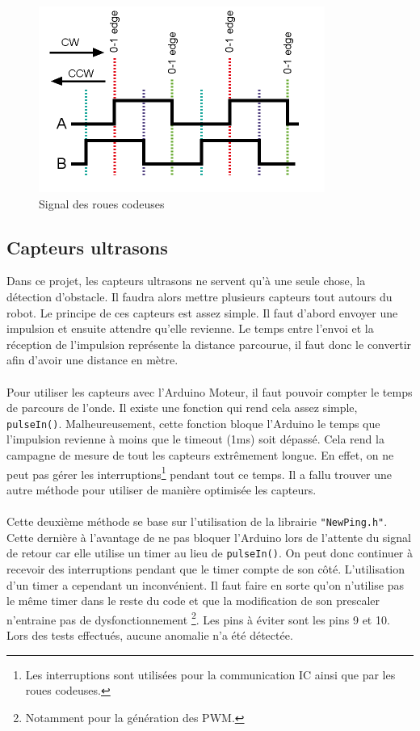 \begin{figure}[!ht]
	\centering
	\includegraphics{roues_codeuses.png}
	\caption{Signal des roues codeuses}
	\label{img:rotary_encoder}
\end{figure}

\subsection{Capteurs ultrasons}
Dans ce projet, les capteurs ultrasons ne servent qu'à une seule chose, la détection d'obstacle. Il faudra alors mettre plusieurs capteurs tout autours du robot. Le principe de ces capteurs est assez simple. Il faut d'abord envoyer une impulsion et ensuite attendre qu'elle revienne. Le temps entre l'envoi et la réception de l'impulsion représente la distance parcourue, il faut donc le convertir afin d'avoir une distance en mètre. 

\paragraph{}
Pour utiliser les capteurs avec l'Arduino Moteur, il faut pouvoir compter le temps de parcours de l'onde. Il existe une fonction qui rend cela assez simple, \lstinline$pulseIn()$. Malheureusement, cette fonction bloque l'Arduino le temps que l'impulsion revienne à moins que le timeout (1ms) soit dépassé. Cela rend la campagne de mesure de tout les capteurs extrêmement longue. En effet, on ne peut pas gérer les interruptions\footnote{Les interruptions sont utilisées pour la communication IC ainsi que par les roues codeuses.} pendant tout ce temps. Il a fallu trouver une autre méthode pour utiliser de manière optimisée les capteurs.

\paragraph{}
Cette deuxième méthode se base sur l'utilisation de la librairie \lstinline$"NewPing.h"$. Cette dernière à l'avantage de ne pas bloquer l'Arduino lors de l'attente du signal de retour car elle utilise un timer au lieu de \lstinline$pulseIn()$. On peut donc continuer à recevoir des interruptions pendant que le timer compte de son côté. L'utilisation d'un timer a cependant un inconvénient. Il faut faire en sorte qu'on n'utilise pas le même timer dans le reste du code et que la modification de son prescaler n'entraine pas de dysfonctionnement \footnote{Notamment pour la génération des PWM.}. Les pins à éviter sont les pins 9 et 10. Lors des tests effectués, aucune anomalie n'a été détectée.

